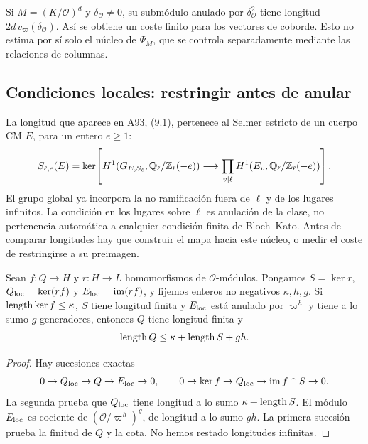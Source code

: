 Si $M=(K/\mathcal O)^d$ y $\delta_{\mathcal O}\ne0$, su
submódulo anulado por $\delta_{\mathcal O}^2$ tiene longitud
$2d\,v_\varpi(\delta_{\mathcal O})$.
Así se obtiene un coste finito para los vectores de coborde.
Esto no estima por sí solo el núcleo de $\Psi_M$, que se
controla separadamente mediante las relaciones de columnas.

\subsection{Condiciones locales: restringir antes de anular}

La longitud que aparece en A93, (9.1), pertenece al Selmer estricto
de un cuerpo CM $E$, para un entero $e\ge1$:
\begin{equation}
 S_{\ell,e}(E)=\ker\!\left[
 H^1(G_{E,S_\ell},\mathbb{Q}_\ell/\mathbb{Z}_\ell(-e))\longrightarrow
 \prod_{v\mid\ell}H^1(E_v,\mathbb{Q}_\ell/\mathbb{Z}_\ell(-e))\right].
 \label{eq:ti-selmer}
\end{equation}
El grupo global ya incorpora la no ramificación fuera de $\ell$
y de los lugares infinitos. La condición en los lugares sobre
$\ell$ es anulación de la clase, no pertenencia automática a
cualquier condición finita de Bloch--Kato.
Antes de comparar longitudes hay que construir el mapa hacia este
núcleo, o medir el coste de restringirse a su preimagen.

\begin{proposicion}
\label{prop:ti-local}
Sean $f:Q\to H$ y $r:H\to L$ homomorfismos de $\mathcal O$-módulos.
Pongamos $S=\ker r$, $Q_{\rm loc}=\ker(rf)$ y $E_{\rm loc}=\operatorname{im}(rf)$,
y fijemos enteros no negativos $\kappa,h,g$.
Si $\operatorname{length}\ker f\le\kappa$, $S$ tiene longitud finita y
$E_{\rm loc}$ está anulado por $\varpi^h$ y tiene a lo sumo
$g$ generadores, entonces $Q$ tiene longitud finita y
\begin{equation}
 \operatorname{length} Q\le\kappa+\operatorname{length} S+gh.
 \label{eq:ti-local-bound}
\end{equation}
\end{proposicion}
\begin{proof}
Hay sucesiones exactas
\[
 0\to Q_{\rm loc}\to Q\to E_{\rm loc}\to0,
 \qquad
 0\to\ker f\to Q_{\rm loc}\to\operatorname{im}f\cap S\to0.
\]
La segunda prueba que $Q_{\rm loc}$ tiene longitud a lo sumo
$\kappa+\operatorname{length} S$. El módulo $E_{\rm loc}$ es cociente de
$(\mathcal O/\varpi^h)^g$, de longitud a lo sumo $gh$.
La primera sucesión prueba la finitud de $Q$ y la cota.
No hemos restado longitudes infinitas.
\end{proof}

